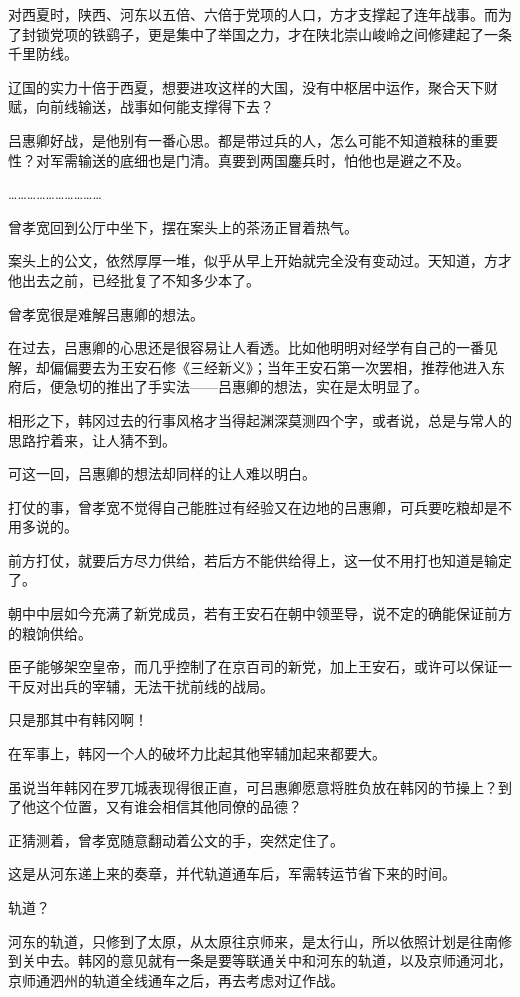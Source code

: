 对西夏时，陕西、河东以五倍、六倍于党项的人口，方才支撑起了连年战事。而为了封锁党项的铁鹞子，更是集中了举国之力，才在陕北崇山峻岭之间修建起了一条千里防线。

辽国的实力十倍于西夏，想要进攻这样的大国，没有中枢居中运作，聚合天下财赋，向前线输送，战事如何能支撑得下去？

吕惠卿好战，是他别有一番心思。都是带过兵的人，怎么可能不知道粮秣的重要性？对军需输送的底细也是门清。真要到两国鏖兵时，怕他也是避之不及。

…………………………

曾孝宽回到公厅中坐下，摆在案头上的茶汤正冒着热气。

案头上的公文，依然厚厚一堆，似乎从早上开始就完全没有变动过。天知道，方才他出去之前，已经批复了不知多少本了。

曾孝宽很是难解吕惠卿的想法。

在过去，吕惠卿的心思还是很容易让人看透。比如他明明对经学有自己的一番见解，却偏偏要去为王安石修《三经新义》；当年王安石第一次罢相，推荐他进入东府后，便急切的推出了手实法——吕惠卿的想法，实在是太明显了。

相形之下，韩冈过去的行事风格才当得起渊深莫测四个字，或者说，总是与常人的思路拧着来，让人猜不到。

可这一回，吕惠卿的想法却同样的让人难以明白。

打仗的事，曾孝宽不觉得自己能胜过有经验又在边地的吕惠卿，可兵要吃粮却是不用多说的。

前方打仗，就要后方尽力供给，若后方不能供给得上，这一仗不用打也知道是输定了。

朝中中层如今充满了新党成员，若有王安石在朝中领垩导，说不定的确能保证前方的粮饷供给。

臣子能够架空皇帝，而几乎控制了在京百司的新党，加上王安石，或许可以保证一干反对出兵的宰辅，无法干扰前线的战局。

只是那其中有韩冈啊！

在军事上，韩冈一个人的破坏力比起其他宰辅加起来都要大。

虽说当年韩冈在罗兀城表现得很正直，可吕惠卿愿意将胜负放在韩冈的节操上？到了他这个位置，又有谁会相信其他同僚的品德？

正猜测着，曾孝宽随意翻动着公文的手，突然定住了。

这是从河东递上来的奏章，并代轨道通车后，军需转运节省下来的时间。

轨道？

河东的轨道，只修到了太原，从太原往京师来，是太行山，所以依照计划是往南修到关中去。韩冈的意见就有一条是要等联通关中和河东的轨道，以及京师通河北，京师通泗州的轨道全线通车之后，再去考虑对辽作战。

